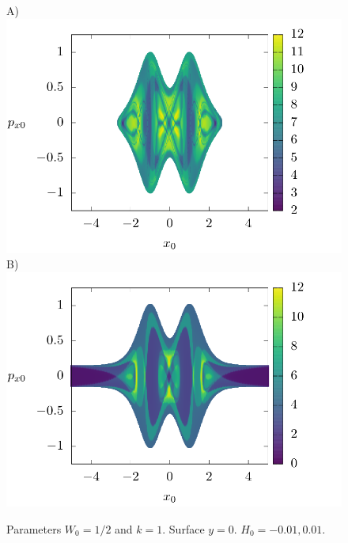 \documentclass[10pt,aps,onecolumn,superscriptaddress]{revtex4-2}
\begin{document}
\begin{figure}[htbp]
	A)\includegraphics[scale=0.35]{ld_xpx_t20_E-001.png}
	B)\includegraphics[scale=0.35]{ld_xpx_t20_E001.png}	
	\caption{Parameters $W_0 = 1/2$ and $k = 1$. Surface $y = 0$. $H_0 =-0.01, 0.01$.  }
	\label{fig:ld_xxxx}
\end{figure}
\end{document}
